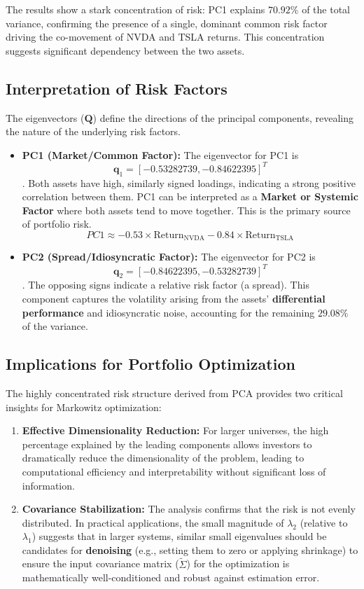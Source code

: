 \documentclass[12pt]{article}
\begin{document}
The results show a stark concentration of risk: PC1 explains $70.92\%$ of the total variance, confirming the presence of a single, dominant common risk factor driving the co-movement of NVDA and TSLA returns. This concentration suggests significant dependency between the two assets.

\subsection{Interpretation of Risk Factors}

The eigenvectors ($\mathbf{Q}$) define the directions of the principal components, revealing the nature of the underlying risk factors.

\begin{itemize}
    \item \textbf{PC1 (Market/Common Factor):} The eigenvector for PC1 is $$\mathbf{q}_1 = [-0.53282739, -0.84622395]^T$$. Both assets have high, similarly signed loadings, indicating a strong positive correlation between them. PC1 can be interpreted as a \textbf{Market or Systemic Factor} where both assets tend to move together. This is the primary source of portfolio risk.
    $$PC1 \approx -0.53 \times \text{Return}_{\text{NVDA}} - 0.84 \times \text{Return}_{\text{TSLA}}$$

    \item \textbf{PC2 (Spread/Idiosyncratic Factor):} The eigenvector for PC2 is $$\mathbf{q}_2 = [-0.84622395, -  0.53282739]^T$$. The opposing signs indicate a relative risk factor (a spread). This component captures the volatility arising from the assets' \textbf{differential performance} and idiosyncratic noise, accounting for the remaining $29.08\%$ of the variance.
\end{itemize}

\subsection{Implications for Portfolio Optimization}
The highly concentrated risk structure derived from PCA provides two critical insights for Markowitz optimization:
\begin{enumerate}
    \item \textbf{Effective Dimensionality Reduction:} For larger universes, the high percentage explained by the leading components allows investors to dramatically reduce the dimensionality of the problem, leading to computational efficiency and interpretability without significant loss of information.
    \item \textbf{Covariance Stabilization:} The analysis confirms that the risk is not evenly distributed. In practical applications, the small magnitude of $\lambda_2$ (relative to $\lambda_1$) suggests that in larger systems, similar small eigenvalues should be candidates for \textbf{denoising} (e.g., setting them to zero or applying shrinkage) to ensure the input covariance matrix ($\tilde{\Sigma}$) for the optimization is mathematically well-conditioned and robust against estimation error.
\end{enumerate}
\end{document}
